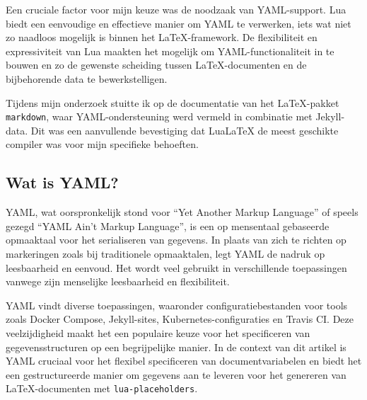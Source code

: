 \documentclass[dutch]{ltugboat}
\def\pkg#1{\texttt{#1}\cite{#1}}
\begin{document}
    Een cruciale factor voor mijn keuze was de noodzaak van YAML-support.
    Lua biedt een eenvoudige en effectieve manier om YAML te verwerken, iets wat niet zo naadloos mogelijk is binnen het LaTeX-framework.
    De flexibiliteit en expressiviteit van Lua maakten het mogelijk om YAML-functionaliteit in te bouwen en zo de gewenste scheiding tussen LaTeX-documenten en de bijbehorende data te bewerkstelligen.

    Tijdens mijn onderzoek stuitte ik op de documentatie van het LaTeX-pakket \pkg{markdown}, waar YAML-ondersteuning werd vermeld in combinatie met Jekyll-data.
    Dit was een aanvullende bevestiging dat LuaLaTeX de meest geschikte compiler was voor mijn specifieke behoeften.

    \subsection{Wat is YAML?}
    YAML, wat oorspronkelijk stond voor ``Yet Another Markup Language'' of speels gezegd ``YAML Ain't Markup Language'', is een op mensentaal gebaseerde opmaaktaal voor het serialiseren van gegevens.
    In plaats van zich te richten op markeringen zoals bij traditionele opmaaktalen, legt YAML de nadruk op leesbaarheid en eenvoud.
    Het wordt veel gebruikt in verschillende toepassingen vanwege zijn menselijke leesbaarheid en flexibiliteit.

    YAML vindt diverse toepassingen, waaronder configuratiebestanden voor tools zoals Docker Compose, Jekyll-sites, Kubernetes-configuraties en Travis CI. Deze veelzijdigheid maakt het een populaire keuze voor het specificeren van gegevensstructuren op een begrijpelijke manier.
    In de context van dit artikel is YAML cruciaal voor het flexibel specificeren van documentvariabelen en biedt het een gestructureerde manier om gegevens aan te leveren voor het genereren van LaTeX-documenten met \pkg{lua-placeholders}.
\end{document}
